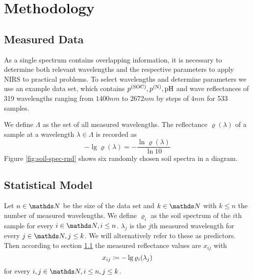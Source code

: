 \section{Methodology}
\label{sec:methodology}
	
	\subsection{Measured Data}
	\label{ssec:measured-data}
	
		As a single spectrum contains overlapping information, it is necessary to determine both relevant wavelengths and the respective parameters to apply NIRS to practical problems.
		To select wavelengths and determine parameters we use an example data set, which contains $p^{\mathrm{(SOC)}},p^{\mathrm{(N)}},\mathrm{pH}$ and wave reflectances of 319 wavelengths ranging from $1400 \unit{nm}$ to $2672 \unit{nm}$ by steps of $4 \unit{nm}$ for 533 samples.%

		We define $\Lambda$ as the set of all measured wavelengths. The reflectance $\varrho(\lambda)$ of a sample at a wavelength $\lambda \in \Lambda$ is recorded as
		\[
			-\lg \varrho(\lambda) = -\frac{\ln \varrho(\lambda)}{\ln 10}
		\]
		Figure \ref{fig:soil-spec-rnd} shows six randomly chosen soil spectra in a diagram.
		\begin{figure*}
			\centering
			
			\caption{This figure shows near infrared soil spectra of six randomly chosen soil samples obtained from the used dataframe.}
			\label{fig:soil-spec-rnd}
		\end{figure*}
		
	

	\subsection{Statistical Model}
	\label{ssec:statistical-model}
	
		Let $n\in\SN$ be the size of the data set and $k\in\SN$ with $k\leq n$ the number of measured wavelengths. We define
		$\varrho_i$ as the soil spectrum of the $i$th sample for every $i\in\SN,i\leq n$.
		$\lambda_j$ is the $j$th measured wavelength for every $j\in\SN,j\leq k$. We will alternatively refer to these as predictors.%
		Then according to section \ref{ssec:measured-data} the measured reflectance values are $x_{ij}$ with
		\[
			x_{ij} \coloneqq -\lg \varrho_i(\lambda_j)
		\]
		for every $i,j\in\SN,i\leq n,j\leq k$.
		
